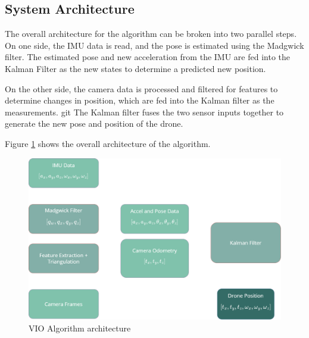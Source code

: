 \documentclass[bare_jrnl_transmag]{subfiles}
\begin{document}
\subsection{System Architecture}

The overall architecture for the algorithm can be broken into two parallel steps. On one side, the IMU data is read, and the pose is estimated using the Madgwick filter. The estimated pose and new acceleration from the IMU are fed into the Kalman Filter as the new states to determine a predicted new position. 

On the other side, the camera data is processed and filtered for features to determine changes in position, which are fed into the Kalman filter as the measurements.
git 
The Kalman filter fuses the two sensor inputs together to generate the new pose and position of the drone. 

Figure \ref{fig:vio-arch} shows the overall architecture of the algorithm. 

\begin{figure}
    [H]
    \centering
    \includegraphics[width=0.8\linewidth]{figures/VIO-arch.png}
    \caption{VIO Algorithm architecture}
    \label{fig:vio-arch}
\end{figure}
\end{document}
